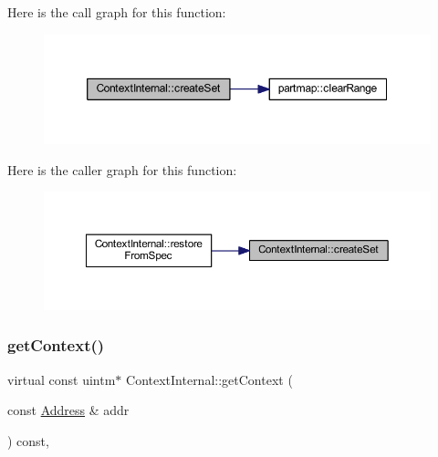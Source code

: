 Here is the call graph for this function\+:
\nopagebreak
\begin{figure}[H]
\begin{center}
\leavevmode
\includegraphics[width=350pt]{class_context_internal_aa3e2cdba48dac0da0a63c023b96fd07a_cgraph}
\end{center}
\end{figure}
Here is the caller graph for this function\+:
\nopagebreak
\begin{figure}[H]
\begin{center}
\leavevmode
\includegraphics[width=350pt]{class_context_internal_aa3e2cdba48dac0da0a63c023b96fd07a_icgraph}
\end{center}
\end{figure}
\mbox{\label{class_context_internal_a817dcba491a21368cfa81b522ff21b39}} 
\subsubsection{\texorpdfstring{getContext()}{getContext()}\hspace{0.1cm}{\footnotesize\ttfamily [1/2]}}
{\footnotesize\ttfamily virtual const uintm$\ast$ Context\+Internal\+::get\+Context (\begin{DoxyParamCaption}\item[{const \mbox{\hyperlink{class_address}{Address}} \&}]{addr }\end{DoxyParamCaption}) const\hspace{0.3cm}{\ttfamily [inline]}, {\ttfamily [virtual]}}



